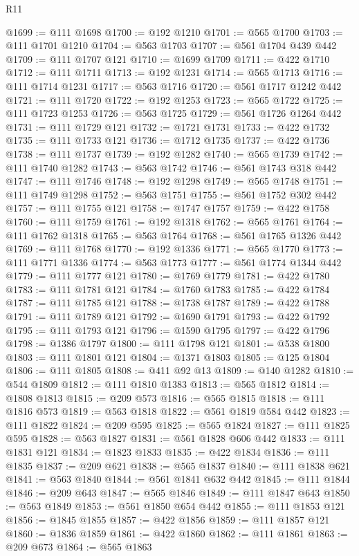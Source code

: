 \begin{lexlean}{R11}
\begin{coremodule}
{{{{{{{{{{{{{{{{{{{{{{{{{{{{{{{{{{{{{{{{{{{{{{{{{{{{{{{{{{{{{{{{{{{{{{{{{{{{{{{{{{@1699 := @111 @1698
@1700 := @192 @1210
@1701 := @565 @1700
@1703 := @111 @1701 @1210
@1704 := @563 @1703
@1707 := @561 @1704 @439 @442
@1709 := @111 @1707 @121
@1710 := @1699 @1709
@1711 := @422 @1710
@1712 := @111 @1711
@1713 := @192 @1231
@1714 := @565 @1713
@1716 := @111 @1714 @1231
@1717 := @563 @1716
@1720 := @561 @1717 @1242 @442
@1721 := @111 @1720
@1722 := @192 @1253
@1723 := @565 @1722
@1725 := @111 @1723 @1253
@1726 := @563 @1725
@1729 := @561 @1726 @1264 @442
@1731 := @111 @1729 @121
@1732 := @1721 @1731
@1733 := @422 @1732
@1735 := @111 @1733 @121
@1736 := @1712 @1735
@1737 := @422 @1736
@1738 := @111 @1737
@1739 := @192 @1282
@1740 := @565 @1739
@1742 := @111 @1740 @1282
@1743 := @563 @1742
@1746 := @561 @1743 @318 @442
@1747 := @111 @1746
@1748 := @192 @1298
@1749 := @565 @1748
@1751 := @111 @1749 @1298
@1752 := @563 @1751
@1755 := @561 @1752 @302 @442
@1757 := @111 @1755 @121
@1758 := @1747 @1757
@1759 := @422 @1758
@1760 := @111 @1759
@1761 := @192 @1318
@1762 := @565 @1761
@1764 := @111 @1762 @1318
@1765 := @563 @1764
@1768 := @561 @1765 @1326 @442
@1769 := @111 @1768
@1770 := @192 @1336
@1771 := @565 @1770
@1773 := @111 @1771 @1336
@1774 := @563 @1773
@1777 := @561 @1774 @1344 @442
@1779 := @111 @1777 @121
@1780 := @1769 @1779
@1781 := @422 @1780
@1783 := @111 @1781 @121
@1784 := @1760 @1783
@1785 := @422 @1784
@1787 := @111 @1785 @121
@1788 := @1738 @1787
@1789 := @422 @1788
@1791 := @111 @1789 @121
@1792 := @1690 @1791
@1793 := @422 @1792
@1795 := @111 @1793 @121
@1796 := @1590 @1795
@1797 := @422 @1796
@1798 := @1386 @1797
@1800 := @111 @1798 @121
@1801 := @538 @1800
@1803 := @111 @1801 @121
@1804 := @1371 @1803
@1805 := @125 @1804
@1806 := @111 @1805
@1808 := @411 @92 @13
@1809 := @140 @1282
@1810 := @544 @1809
@1812 := @111 @1810 @1383
@1813 := @565 @1812
@1814 := @1808 @1813
@1815 := @209 @573
@1816 := @565 @1815
@1818 := @111 @1816 @573
@1819 := @563 @1818
@1822 := @561 @1819 @584 @442
@1823 := @111 @1822
@1824 := @209 @595
@1825 := @565 @1824
@1827 := @111 @1825 @595
@1828 := @563 @1827
@1831 := @561 @1828 @606 @442
@1833 := @111 @1831 @121
@1834 := @1823 @1833
@1835 := @422 @1834
@1836 := @111 @1835
@1837 := @209 @621
@1838 := @565 @1837
@1840 := @111 @1838 @621
@1841 := @563 @1840
@1844 := @561 @1841 @632 @442
@1845 := @111 @1844
@1846 := @209 @643
@1847 := @565 @1846
@1849 := @111 @1847 @643
@1850 := @563 @1849
@1853 := @561 @1850 @654 @442
@1855 := @111 @1853 @121
@1856 := @1845 @1855
@1857 := @422 @1856
@1859 := @111 @1857 @121
@1860 := @1836 @1859
@1861 := @422 @1860
@1862 := @111 @1861
@1863 := @209 @673
@1864 := @565 @1863
}}}}}}}}}}}}}}}}}}}}}}}}}}}}}}}}}}}}}}}}}}}}}}}}}}}}}}}}}}}}}}}}}}}}}}}}}}}}}}}}}}
\end{coremodule}
\end{lexlean}
